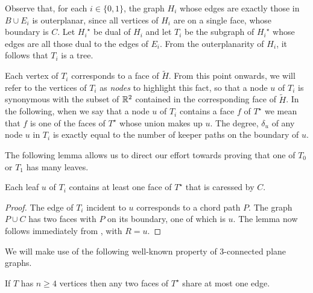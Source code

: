 \documentclass[a4paper,UKenglish]{socg-lipics-v2019}
\newcommand{\dual}[1]{{#1}^\star}
\begin{document}
Observe that, for each $i\in\{0,1\}$, the graph $H_i$ whose edges are
exactly those in $B\cup E_i$ is outerplanar, since all vertices of $H_i$
are on a single face, whose boundary is $C$.  Let $\dual{H_i}$ be dual
of $H_i$ and let $T_i$ be the subgraph of $\dual{H_i}$ whose edges are
all those dual to the edges of $E_i$. From the outerplanarity of $H_i$,
it follows that $T_i$ is a tree.  

Each vertex of $T_i$ corresponds to a face of $\tilde{H}$.  From this
point onwards, we will refer to the vertices of $T_i$ as \emph{nodes}
to highlight this fact, so that a node $u$ of $T_i$ is synonymous with
the subset of $\mathbb{R}^2$ contained in the corresponding face of $\tilde{H}$.
In the following, when we say that a node $u$ of $T_i$ contains a face $f$
of $\dual{T}$ we mean that $f$ is one of the faces of $\dual{T}$ whose
union makes up $u$.  The degree, $\delta_u$ of any node $u$ in $T_i$
is exactly equal to the number of keeper paths on the boundary of $u$.

The following lemma allows us to direct our effort towards proving that
one of $T_0$ or $T_1$ has many leaves.

\begin{lem}
   Each leaf $u$ of $T_i$ contains at least one face of $\dual{T}$
   that is caressed by $C$.
\end{lem}

\begin{proof}
   The edge of $T_i$ incident to $u$ corresponds to a chord path $P$. The
   graph $P\cup C$ has two faces with $P$ on its boundary, one of which
   is $u$.  The lemma now follows immediately from ,
   with $R=u$.
\end{proof}

We will make use of the following well-known property of
3-connected plane graphs.

\begin{lem}
   If $T$ has $n\ge 4$ vertices then any two faces of $\dual{T}$ share at 
   most one edge.
\end{lem}

\end{document}

